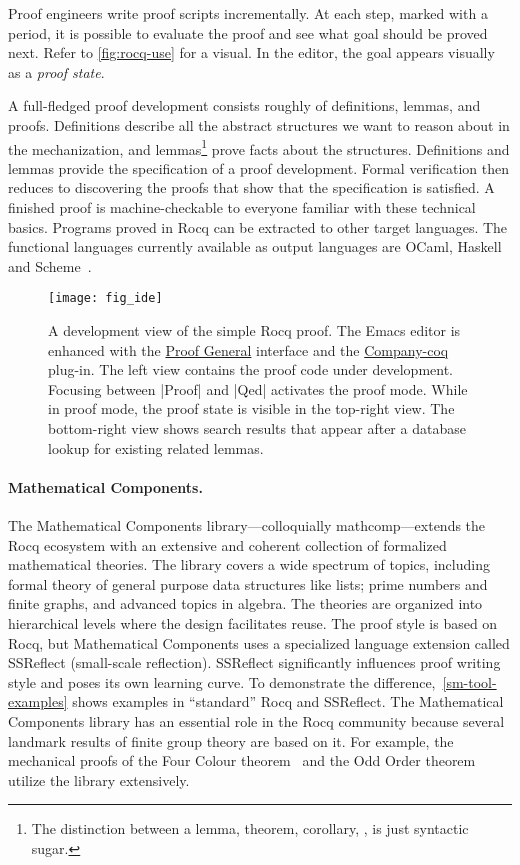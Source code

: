 Proof engineers write proof scripts incrementally.
At each step, marked with a period, it is possible to evaluate the proof and see what goal should be proved next.
Refer to \autoref{fig:rocq-use} for a visual.
In the editor, the goal appears visually as a \emph{proof state}.

A full-fledged proof development consists roughly of definitions, lemmas, and proofs.
Definitions describe all the abstract structures we want to reason about in the mechanization,
and lemmas\footnote{The distinction between a lemma, theorem, corollary, \etc, is just syntactic sugar.}
prove facts about the structures.
Definitions and lemmas provide the specification of a proof development.
Formal verification then reduces to discovering the proofs that show that the specification is satisfied.
A finished proof is machine-checkable to everyone familiar with these technical basics.
Programs proved in Rocq can be extracted to other target languages.
The functional languages currently available as output languages are
OCaml, Haskell and Scheme~\cite{rocqdoc}.

\begin{figure}[ht]
\begin{center}
\texttt{[image: fig\_ide]}
\end{center}
\caption[Development view of the simple Rocq proof]
{A development view of the simple Rocq proof.
The Emacs editor is enhanced with the \href{https://proofgeneral.github.io/}{Proof General} interface
and the \href{https://github.com/cpitclaudel/company-coq}{Company-coq} plug-in.
The left view contains the proof code under development.
Focusing between \pr|Proof| and \pr|Qed| activates the {proof mode}.
While in proof mode, the {proof state} is visible in the top-right view.
The bottom-right view shows search results that appear after a database lookup for existing related lemmas.}
\label{fig:rocq-use}
\end{figure}

\paragraph*{Mathematical Components.}
The Mathematical Components library---colloquially mathcomp---extends the Rocq ecosystem with an extensive and coherent collection of formalized mathematical theories.
The library covers a wide spectrum of topics, including formal theory of general purpose data structures like lists;
prime numbers and finite graphs, and advanced topics in algebra.
The theories are organized into hierarchical levels where the design facilitates reuse.
The proof style is based on Rocq, but Mathematical Components uses a specialized language extension called SSReflect (small-scale reflection).
SSReflect significantly influences proof writing style and poses its own learning curve.
To demonstrate the difference,~\autoref{sm-tool-examples} shows examples in \enquote{standard} Rocq and SSReflect.
The Mathematical Components library has an essential role in the Rocq community because several landmark results of finite group theory are based on it.
For example, the mechanical proofs of the Four Colour theorem~\cite{gonthier2008} and the Odd Order theorem~\cite{gonthier2013} utilize the library extensively.

